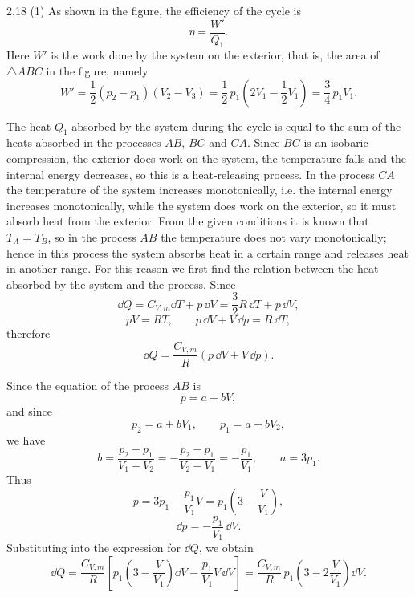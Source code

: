 \begin{solution}{2.18}
(1) As shown in the figure, the efficiency of the cycle is
\begin{equation*}
\eta = \frac{W'}{Q_1}.
\end{equation*}
Here $W'$ is the work done by the system on the exterior, that is, the area of $\triangle ABC$ in
the figure, namely
\begin{equation*}
W' = \frac{1}{2}(p_2-p_1)(V_2-V_3)
= \frac{1}{2}\,p_1\left(2V_1-\frac{1}{2}V_1\right)
= \frac{3}{4}\,p_1V_1 .
\end{equation*}

The heat $Q_1$ absorbed by the system during the cycle is equal to the sum of the heats absorbed
in the processes $AB$, $BC$ and $CA$. Since $BC$ is an isobaric compression, the exterior does
work on the system, the temperature falls and the internal energy decreases, so this is a
heat-releasing process. In the process $CA$ the temperature of the system increases
monotonically, i.e. the internal energy increases monotonically, while the system does work on
the exterior, so it must absorb heat from the exterior. From the given conditions it is known
that $T_A=T_B$, so in the process $AB$ the temperature does not vary monotonically; hence in
this process the system absorbs heat in a certain range and releases heat in another range. For
this reason we first find the relation between the heat absorbed by the system and the process.
Since
\begin{equation*}
\dd Q = C_{V,m}\dd T + p\,\dd V = \frac{3}{2}R\,\dd T + p\,\dd V,
\end{equation*}
\begin{equation*}
pV = RT,\qquad p\,\dd V + V\,\dd p = R\,\dd T,
\end{equation*}
therefore
\begin{equation*}
\dd Q = \frac{C_{V,m}}{R}\left(p\,\dd V + V\,\dd p\right).
\end{equation*}

Since the equation of the process $AB$ is
\begin{equation*}
p = a + bV,
\end{equation*}
and since
\begin{equation*}
p_2 = a + bV_1,\qquad p_1 = a + bV_2,
\end{equation*}
we have
\begin{equation*}
b = \frac{p_2-p_1}{V_1-V_2} = -\frac{p_2-p_1}{V_2-V_1} = -\frac{p_1}{V_1};
\qquad a = 3p_1 .
\end{equation*}
Thus
\begin{equation*}
p = 3p_1 - \frac{p_1}{V_1}V = p_1\left(3-\frac{V}{V_1}\right),
\end{equation*}
\begin{equation*}
\dd p = -\frac{p_1}{V_1}\,\dd V .
\end{equation*}
Substituting into the expression for $\dd Q$, we obtain
\begin{equation*}
\dd Q = \frac{C_{V,m}}{R}\left[p_1\left(3-\frac{V}{V_1}\right)\dd V
- \frac{p_1}{V_1}V\,\dd V\right]
= \frac{C_{V,m}}{R}\,p_1\left(3-2\frac{V}{V_1}\right)\dd V .
\end{equation*}


\end{solution}
